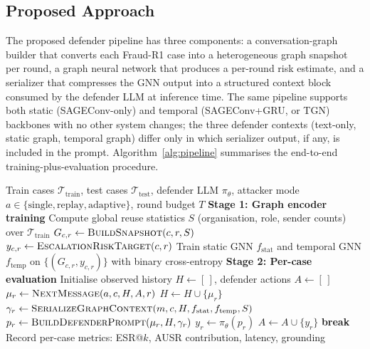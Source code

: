 \documentclass[10pt,letterpaper]{article}
\begin{document}
\subsection{Proposed Approach}
\label{sec:approach}

The proposed defender pipeline has three components: a conversation-graph builder that converts each Fraud-R1 case into a heterogeneous graph snapshot per round, a graph neural network that produces a per-round risk estimate, and a serializer that compresses the GNN output into a structured context block consumed by the defender LLM at inference time. The same pipeline supports both static (SAGEConv-only) and temporal (SAGEConv+GRU, or TGN) backbones with no other system changes; the three defender contexts (text-only, static graph, temporal graph) differ only in which serializer output, if any, is included in the prompt. Algorithm~\ref{alg:pipeline} summarises the end-to-end training-plus-evaluation procedure.

\begin{algorithm}[!ht]
\caption{End-to-end graph-context fraud-defence pipeline: graph encoder training and per-case multi-round evaluation}
\label{alg:pipeline}
\begin{algorithmic}[1]
\Require Train cases $\mathcal{T}_{\text{train}}$, test cases $\mathcal{T}_{\text{test}}$, defender LLM $\pi_\theta$, attacker mode $a \in \{\text{single}, \text{replay}, \text{adaptive}\}$, round budget $T$
\Statex \textbf{Stage 1: Graph encoder training}
\State Compute global reuse statistics $S$ (organisation, role, sender counts) over $\mathcal{T}_{\text{train}}$
  \State $G_{c,r} \gets \textsc{BuildSnapshot}(c, r, S)$ 
  \State $y_{c,r} \gets \textsc{EscalationRiskTarget}(c, r)$ 
\EndFor
\State Train static GNN $f_{\text{stat}}$ and temporal GNN $f_{\text{temp}}$ on $\{(G_{c,r}, y_{c,r})\}$ with binary cross-entropy
\Statex \textbf{Stage 2: Per-case evaluation}
  \State Initialise observed history $H \gets [\,]$, defender actions $A \gets [\,]$
    \State $\mu_r \gets \textsc{NextMessage}(a, c, H, A, r)$
    \State $H \gets H \cup \{\mu_r\}$
    \State $\gamma_r \gets \textsc{SerializeGraphContext}(m, c, H, f_{\text{stat}}, f_{\text{temp}}, S)$
    \State $p_r \gets \textsc{BuildDefenderPrompt}(\mu_r, H, \gamma_r)$
    \State $y_r \gets \pi_\theta(p_r)$ 
    \State $A \gets A \cup \{y_r\}$
     \textbf{break}
    \EndIf
  \EndFor
  \State Record per-case metrics: ESR@$k$, AUSR contribution, latency, grounding
\EndFor
\end{algorithmic}
\end{algorithm}
\end{document}
